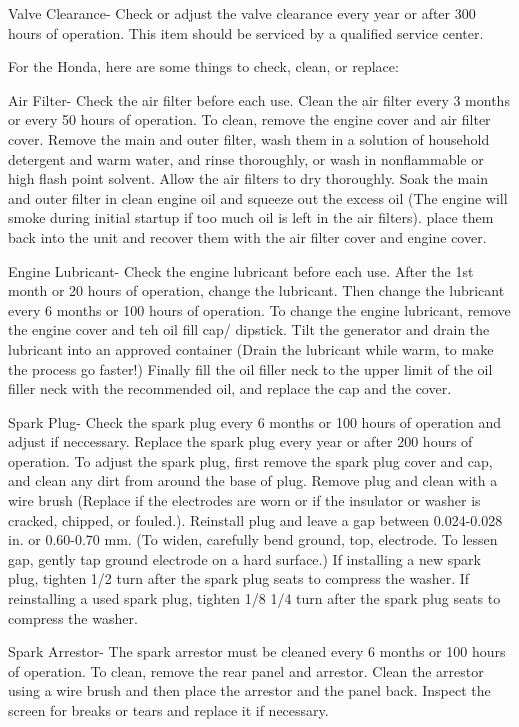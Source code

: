 \documentclass[12pt]{../SOP3_beta}
\begin{document}
\NP Valve Clearance- Check or adjust the valve clearance every year or after 300 hours of operation. This item should be serviced by a qualified service center.

\NP For the Honda, here are some things to check, clean, or replace:

\NP Air Filter- Check the air filter before each use. Clean the air filter every 3 months or every 50 hours of operation. To clean, remove the engine cover and air filter cover. Remove the main and outer filter, wash them in a solution of household detergent and warm water, and rinse thoroughly, or wash in nonflammable or high flash point solvent. Allow the air filters to dry thoroughly. Soak the main and outer filter in clean engine oil and squeeze out the excess oil (The engine will smoke during initial startup if too much oil is left in the air filters). place them back into the unit and recover them with the air filter cover and engine cover.

\NP Engine Lubricant- Check the engine lubricant before each use. After the 1st month or 20 hours of operation, change the lubricant. Then change the lubricant every 6 months or 100 hours of operation. To change the engine lubricant, remove the engine cover and teh oil fill cap/ dipstick. Tilt the generator and drain the lubricant into an approved container (Drain the lubricant while warm, to make the process go faster!) Finally fill the oil filler neck to the upper limit of the oil filler neck with the recommended oil, and replace the cap and the cover.

\NP Spark Plug- Check the spark plug every 6 months or 100 hours of operation and adjust if neccessary. Replace the spark plug every year or after 200 hours of operation. To adjust the spark plug, first remove the spark plug cover and cap, and clean any dirt from around the base of plug. Remove plug and clean with a wire brush (Replace if the electrodes are worn or if the insulator or washer is cracked, chipped, or fouled.). Reinstall plug and leave a gap between 0.024-0.028 in. or 0.60-0.70 mm. (To widen, carefully bend ground, top, electrode. To lessen gap, gently tap ground electrode on a hard surface.) If installing a new spark plug, tighten 1/2 turn after the spark plug seats to compress the washer. If reinstalling a used spark plug, tighten 1/8 1/4 turn after the spark plug seats to compress the washer.

\NP Spark Arrestor- The spark arrestor must be cleaned every 6 months or 100 hours of operation. To clean, remove the rear panel and arrestor. Clean the arrestor using a wire brush and then place the arrestor and the panel back. Inspect the screen for breaks or tears and replace it if necessary.
\end{document}
